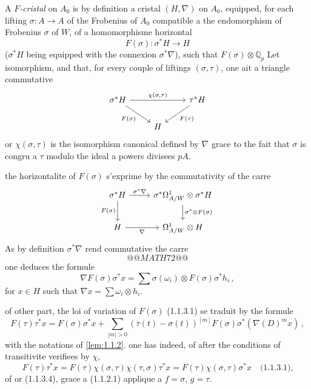 \documentclass[12pt,a4paper]{article}
\theoremstyle{plain}
\theoremstyle{definition}
\theoremstyle{remark}
\begin{document}
A \emph{$F$-cristal} on $A_0$ is by definition a cristal $(H,\nabla)$ on $A_0$, equipped, for each lifting $\sigma : A \to A$ of the Frobenius of $A_0$ compatible a the endomorphism of Frobenius $\sigma$ of $W$, of a homomorphisme horizontal
\[
F(\sigma) : \sigma^*H \longrightarrow H
\]
($\sigma^*H$ being equipped with the connexion $\sigma^*\nabla$), such that $F(\sigma) \otimes \mathbb{Q}_p$ Let isomorphism, and that, for every couple of liftings $(\sigma, \tau)$, one ait a triangle commutative
\begin{equation}\label{eq:1.1.3.1}
\begin{tikzcd}
\sigma^*H \arrow{rr}{\chi(\sigma,\tau)} \arrow{dr}[swap]{F(\sigma)} && \tau^*H \arrow{dl}{F(\tau)} \\
& H
\end{tikzcd}
\end{equation}
or $\chi(\sigma,\tau)$ is the isomorphism canonical defined by $\nabla$ grace to the fait that $\sigma$ is congru a $\tau$ modulo the ideal a powers divisees $pA$.

the horizontalite of $F(\sigma)$ s'exprime by the commutativity of the carre
\begin{equation}\label{eq:1.1.3.2}
\begin{tikzcd}
\sigma^*H \rar{\sigma^*\nabla} \dar[swap]{F(\sigma)} & \sigma^*\Omega^1_{A/W} \otimes \sigma^*H \dar{\sigma^* \otimes F(\sigma)} \\
H \rar[swap]{\nabla} & \Omega^1_{A/W} \otimes H
\end{tikzcd}
\end{equation}
As by definition $\sigma^*\nabla$ rend commutative the carre
\[
@@MATH72@@
\]
one deduces the formule
\begin{equation}\label{eq:1.1.3.3}
\nabla F(\sigma)\sigma^*x = \sum \sigma(\omega_i) \otimes F(\sigma)\sigma^*h_i\,,
\end{equation}
for $x \in H$ such that $\nabla x = \sum \omega_i \otimes h_i$.

of other part, the loi of variation of $F(\sigma)$ (1.1.3.1) se traduit by the formule
\begin{equation}\label{eq:1.1.3.4}
F(\tau)\tau^*x = F(\sigma)\sigma^*x + \sum_{|m|>0} (\tau(t)-\sigma(t))^{[m]} F(\sigma)\sigma^*(\nabla(D)^m x)\,,
\end{equation}
with the notations of \ref{lem:1.1.2}. one has indeed, of after the conditions of transitivite verifiees by $\chi$,
\[
F(\tau)\tau^*x = F(\tau)\chi(\sigma,\tau)\chi(\tau,\sigma)\tau^*x = F(\tau)\chi(\sigma,\tau)\sigma^*x \quad \text{(1.1.3.1),}
\]
of or (1.1.3.4), grace a (1.1.2.1) applique a $f = \sigma$, $g = \tau$.
\end{document}
